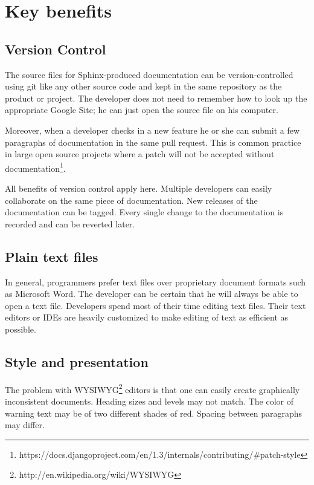 \documentclass[letterpaper]{report}
\begin{document}
\section*{Key benefits}

    \subsection*{Version Control}

        The source files for Sphinx-produced documentation can be
        version-controlled using git like any other source code and kept in the
        same repository as the product or project. The developer does not need
        to remember how to look up the appropriate Google Site; he can just
        open the source file on his computer.

        Moreover, when a developer checks in a new feature he or she can submit
        a few paragraphs of documentation in the same pull request. This is
        common practice in large open source projects where a patch will not be
        accepted without
        documentation\footnote{https://docs.djangoproject.com/en/1.3/internals/contributing/\#patch-style}.

        All benefits of version control apply here. Multiple developers can
        easily collaborate on the same piece of documentation. New releases of
        the documentation can be tagged. Every single change to the
        documentation is recorded and can be reverted later.

    \subsection*{Plain text files}

        In general, programmers prefer text files over proprietary document
        formats such as Microsoft Word. The developer can be certain that he
        will always be able to open a text file. Developers spend most of their
        time editing text files. Their text editors or IDEs are heavily
        customized to make editing of text as efficient as possible.

    \subsection*{Style and presentation}

        The problem with WYSIWYG\footnote{http://en.wikipedia.org/wiki/WYSIWYG}
        editors is that one can easily create graphically inconsistent
        documents. Heading sizes and levels may not match. The color of warning
        text may be of two different shades of red. Spacing between paragraphs
        may differ.
\end{document}
